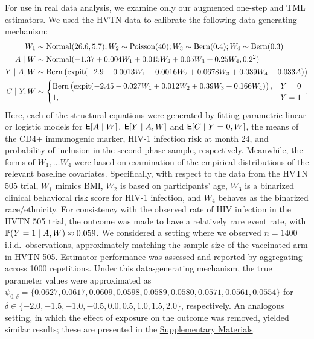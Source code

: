 For use in real data analysis, we examine only our augmented one-step and TML
estimators. We used the HVTN data to calibrate the following data-generating
mechanism:
\begin{align*}
  W_1 & \sim \mbox{Normal}(26.6, 5.7);
  W_2 \sim \text{Poisson}(40);
  W_3 \sim \operatorname{Bern}(0.4);
  W_4 \sim \operatorname{Bern}(0.3) \\
  A \mid W & \sim \mbox{Normal}(-1.37 + 0.004 W_1 + 0.015 W_2 + 0.05 W_3 +
    0.25 W_4, 0.2^2)\\
  Y \mid A, W & \sim \operatorname{Bern} \left(\operatorname{expit} (-2.9 - 0.0013 W_1 - 0.0016 W_2 +
    0.0678 W_3 + 0.039 W_4 - 0.033 A) \right) \\
  C \mid Y, W & \sim
    \begin{cases}
      \operatorname{Bern} \left(\operatorname{expit} (-2.45 - 0.027 W_1 + 0.012 W_2 + 0.39 W_3
      + 0.166 W_4) \right), & Y = 0 \\ 1, & Y = 1
    \end{cases} \ .
\end{align*}
Here, each of the structural equations were generated by fitting parametric
linear or logistic models for $\mathsf{E}[A \mid W]$, $\mathsf{E}[Y \mid A, W]$ and $\mathsf{E}[C \mid
Y = 0, W]$, the means of the CD4+ immunogenic marker, HIV-1 infection risk at
month 24, and probability of inclusion in the second-phase sample, respectively.
Meanwhile, the forms of $W_1, \ldots W_4$ were based on examination of the
empirical distributions of the relevant baseline covariates. Specifically, with
respect to the data from the HVTN 505 trial, $W_1$ mimics BMI, $W_2$ is based on
participants' age, $W_3$ is a binarized clinical behavioral risk score for HIV-1
infection, and $W_4$ behaves as the binarized race/ethnicity. For consistency
with the observed rate of HIV infection in the HVTN 505 trial, the outcome was
made to have a relatively rare event rate, with $\mathbb{P}(Y = 1 \mid A, W) \approx
0.059$. We considered a setting where we observed $n = 1400$
i.i.d.~observations, approximately matching the sample size of the vaccinated
arm in HVTN 505. Estimator performance was assessed and reported by aggregating
across 1000 repetitions. Under this data-generating mechanism, the true
parameter values were approximated as $\psi_{0,\delta} = \{0.0627, 0.0617,
0.0609, 0.0598, 0.0589, \allowbreak 0.0580, 0.0571, 0.0561, 0.0554\}$ for
$\delta \in \{-2.0, -1.5, -1.0, \allowbreak -0.5, 0.0, 0.5, 1.0, 1.5, 2.0\}$,
respectively. An analogous setting, in which the effect of exposure on the
outcome was removed, yielded similar results; these are presented in the
\href{sm}{Supplementary Materials}.

